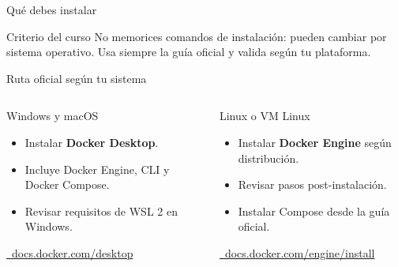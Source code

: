 \documentclass[aspectratio=169]{beamer}
\begin{document}
\begin{frame}{Qué debes instalar}
  \begin{center}
  \end{center}
  \vspace{0.2cm}
  \begin{block}{Criterio del curso}
    No memorices comandos de instalación: pueden cambiar por sistema operativo. Usa siempre la guía oficial y valida según tu plataforma.
  \end{block}
\end{frame}

\begin{frame}{Ruta oficial según tu sistema}
  \small
  \begin{columns}[T]
    \begin{exampleblock}{Windows y macOS}
      \begin{itemize}
        \item Instalar \textbf{Docker Desktop}.
        \item Incluye Docker Engine, CLI y Docker Compose.
        \item Revisar requisitos de WSL 2 en Windows.
      \end{itemize}
      \vspace{0.1cm}
      \href{https://docs.docker.com/desktop/}{\faExternalLink*\ docs.docker.com/desktop}
    \end{exampleblock}
    \begin{block}{Linux o VM Linux}
      \begin{itemize}
        \item Instalar \textbf{Docker Engine} según distribución.
        \item Revisar pasos post-instalación.
        \item Instalar Compose desde la guía oficial.
      \end{itemize}
      \vspace{0.1cm}
      \href{https://docs.docker.com/engine/install/}{\faExternalLink*\ docs.docker.com/engine/install}
    \end{block}
  \end{columns}
\end{frame}
\end{document}
